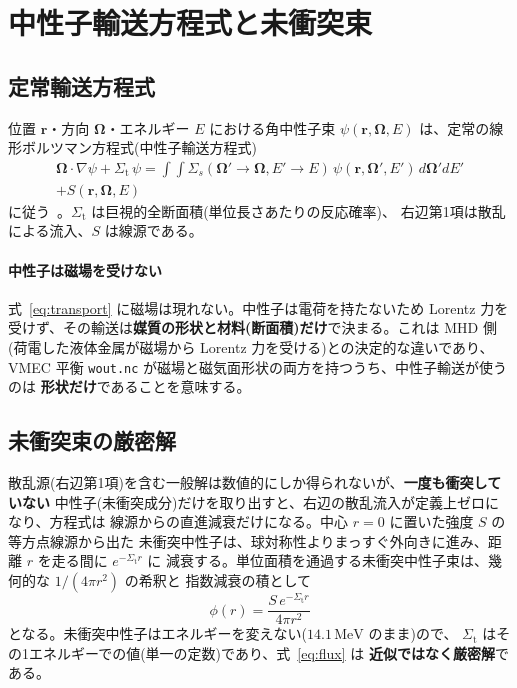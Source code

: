 \documentclass{ltjsarticle}   %
\newcommand{\Sigmat}{\Sigma_\mathrm{t}}
\begin{document}
\section{中性子輸送方程式と未衝突束}

\subsection{定常輸送方程式}

位置 $\boldsymbol{r}$・方向 $\boldsymbol{\Omega}$・エネルギー $E$ における角中性子束
$\psi(\boldsymbol{r},\boldsymbol{\Omega},E)$ は、定常の線形ボルツマン方程式(中性子輸送方程式)
\begin{multline}
  \boldsymbol{\Omega}\cdot\nabla\psi + \Sigmat\,\psi
  = \int\!\!\int \Sigma_s(\boldsymbol{\Omega}'\!\to\boldsymbol{\Omega},E'\!\to E)\,
      \psi(\boldsymbol{r},\boldsymbol{\Omega}',E')\,d\boldsymbol{\Omega}'dE' \\
   + S(\boldsymbol{r},\boldsymbol{\Omega},E)
  \label{eq:transport}
\end{multline}
に従う~\cite{lewis1993}。$\Sigmat$ は巨視的全断面積(単位長さあたりの反応確率)、
右辺第1項は散乱による流入、$S$ は線源である。

\paragraph{中性子は磁場を受けない}
式~\eqref{eq:transport} に磁場は現れない。中性子は電荷を持たないため Lorentz 力を
受けず、その輸送は\textbf{媒質の形状と材料(断面積)だけ}で決まる。これは MHD 側
(荷電した液体金属が磁場から Lorentz 力を受ける)との決定的な違いであり、
VMEC 平衡 \texttt{wout.nc} が磁場と磁気面形状の両方を持つうち、中性子輸送が使うのは
\textbf{形状だけ}であることを意味する。

\subsection{未衝突束の厳密解}
\label{sec:analytic}

散乱源(右辺第1項)を含む一般解は数値的にしか得られないが、\textbf{一度も衝突していない}
中性子(未衝突成分)だけを取り出すと、右辺の散乱流入が定義上ゼロになり、方程式は
線源からの直進減衰だけになる。中心 $r=0$ に置いた強度 $S$ の等方点線源から出た
未衝突中性子は、球対称性よりまっすぐ外向きに進み、距離 $r$ を走る間に $e^{-\Sigmat r}$ に
減衰する。単位面積を通過する未衝突中性子束は、幾何的な $1/(4\pi r^2)$ の希釈と
指数減衰の積として
\begin{equation}
  \boxed{\;
  \phi(r) = \frac{S\,e^{-\Sigmat r}}{4\pi r^2}
  \;}
  \label{eq:flux}
\end{equation}
となる。未衝突中性子はエネルギーを変えない($14.1\,\mathrm{MeV}$ のまま)ので、
$\Sigmat$ はその1エネルギーでの値(単一の定数)であり、式~\eqref{eq:flux} は
\textbf{近似ではなく厳密解}である。
\end{document}
